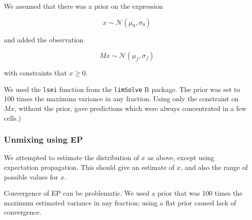\documentclass{article}
\begin{document}
We assumed that there was a prior on the expression

\[
x \sim \mathcal{N}(\mu_0, \sigma_0)
\]

and added the observation

\[
Mx \sim \mathcal{N}(\mu_f, \sigma_f)
\]

with constraints that $x \ge 0$.

We used the {\tt lsei} function from the {\tt limSolve} R package.
The prior was set to 100 times the maximum variance in any fraction.
Using only the constraint on $Mx$, without the prior, gave predictions which were
always concentrated in a few cells.)

\subsubsection*{Unmixing using EP}

We attempted to estimate the distribution of $x$ as above, except using
expectation propagation. This should give an estimate of $x$,
and also the range of possible values for $x$.

Convergence of EP can be problematic. 
We used a prior that was 100 times the maximum estimated variance
in any fraction; using a flat prior caused lack of convergence.
\end{document}

